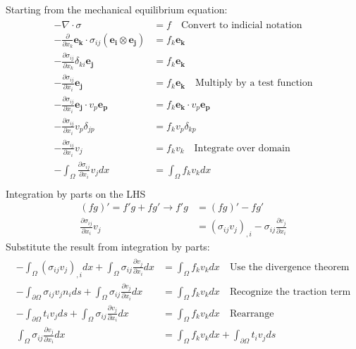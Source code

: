 \documentclass[12pt]{article}
\numberwithin{equation}{section}
\begin{document}
Starting from the mechanical equilibrium equation: 
\begin{align*}
\begin{split}
 - \nabla \cdot \sigma &= f \quad \text{Convert to indicial notation} \\
	- \frac{\partial}{\partial x_k} \mathbf{e_k} \cdot \sigma_{ij} (\mathbf{e_i} \otimes \mathbf{e_j}) &= f_k \mathbf{e_k} \\
	- \frac{\partial \sigma_{ij}}{\partial x_k} \delta_{ki} \mathbf{e_j} &= f_k \mathbf{e_k} \\
	- \frac{\partial \sigma_{ij}}{\partial x_i} \mathbf{e_j} &= f_k \mathbf{e_k} \quad \text{Multiply by a test function} \\
	- \frac{\partial \sigma_{ij}}{\partial x_i} \mathbf{e_j} \cdot v_p \mathbf{e_p} &= f_k \mathbf{e_k} \cdot v_p \mathbf{e_p} \\
	- \frac{\partial \sigma_{ij}}{\partial x_i} v_p \delta_{jp} &= f_k v_p \delta_{kp} \\
	- \frac{\partial \sigma_{ij}}{\partial x_i} v_j &= f_k v_k \quad \text{Integrate over domain} \\
	- \int_{\Omega} \frac{\partial \sigma_{ij}}{\partial x_i} v_j dx &= \int_{\Omega} f_k v_k dx \\
\end{split}
\end{align*}
Integration by parts on the LHS 
\begin{align*}
(fg)' = f'g + fg' \rightarrow f'g &= (fg)' - fg' \\
\frac{\partial \sigma_{ij}}{\partial x_i} v_j &= (\sigma_{ij} v_j)_{,i} - \sigma_{ij} \frac{\partial v_j}{\partial x_i} 
\end{align*}
Substitute the result from integration by parts: 
\begin{align*}
\begin{split}
- \int_{\Omega} (\sigma_{ij} v_j)_{,i} dx + \int_{\Omega} \sigma_{ij} \frac{\partial v_j}{\partial x_i} dx &= \int_{\Omega} f_k v_k dx \quad \text{Use the divergence theorem} \\ 
- \int_{\partial \Omega} \sigma_{ij} v_j n_i ds + \int_{\Omega} \sigma_{ij} \frac{\partial v_j}{\partial x_i} dx &= \int_{\Omega} f_k v_k dx \quad \text{Recognize the traction term} \\
- \int_{\partial \Omega} t_i v_j ds + \int_{\Omega} \sigma_{ij} \frac{\partial v_j}{\partial x_i} dx &= \int_{\Omega} f_k v_k dx \quad \text{Rearrange} \\
 \int_{\Omega} \sigma_{ij} \frac{\partial v_j}{\partial x_i} dx &= \int_{\Omega} f_k v_k dx + \int_{\partial \Omega} t_i v_j ds
\end{split}
\end{align*}
\end{document}

